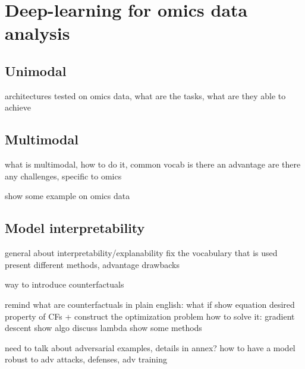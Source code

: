 \documentclass[../main.tex]{subfiles}
\begin{document}
\chapter{Deep-learning for omics data analysis}\label{chap:sota}
\minitocpage

\section{Unimodal}
architectures tested on omics data, what are the tasks, what are they able to achieve

\section{Multimodal}
what is multimodal, how  to do it, common vocab
is there an advantage
are there any challenges, specific to omics

show some example on omics data

\section{Model interpretability}
general about interpretability/explanability
fix the vocabulary that is used
present different methods, advantage drawbacks

way to introduce counterfactuals

remind what are counterfactuals in plain english: what if
show equation
desired property of CFs + construct the optimization problem
how to solve it: gradient descent show algo
discuss lambda
show some methods

need to talk about adversarial examples, details in annex?
how to have a model robust to adv attacks, defenses, adv training
\end{document}
